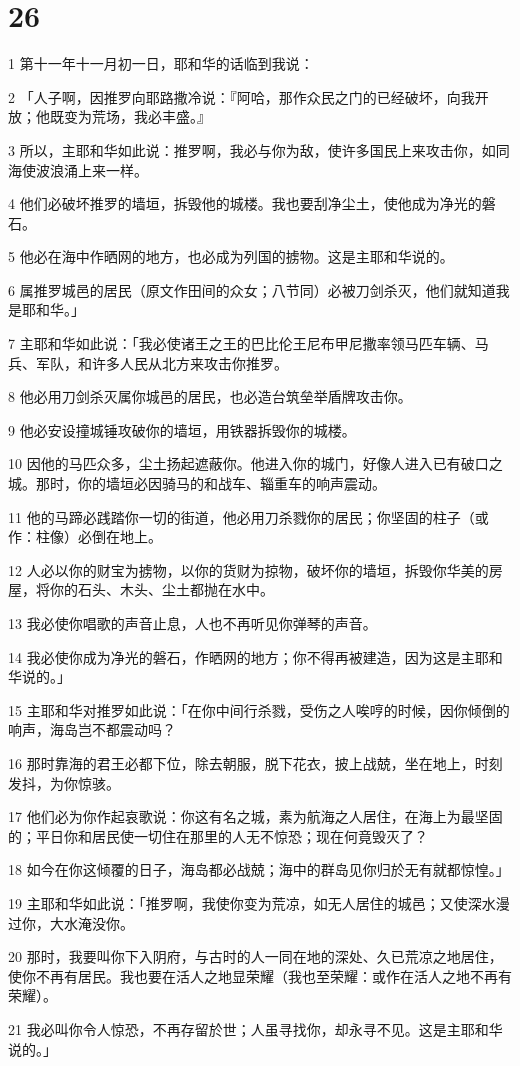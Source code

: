 \chapter{26}

\par 1 第十一年十一月初一日，耶和华的话临到我说：
\par 2 「人子啊，因推罗向耶路撒冷说：『阿哈，那作众民之门的已经破坏，向我开放；他既变为荒场，我必丰盛。』
\par 3 所以，主耶和华如此说：推罗啊，我必与你为敌，使许多国民上来攻击你，如同海使波浪涌上来一样。
\par 4 他们必破坏推罗的墙垣，拆毁他的城楼。我也要刮净尘土，使他成为净光的磐石。
\par 5 他必在海中作晒网的地方，也必成为列国的掳物。这是主耶和华说的。
\par 6 属推罗城邑的居民（原文作田间的众女；八节同）必被刀剑杀灭，他们就知道我是耶和华。」
\par 7 主耶和华如此说：「我必使诸王之王的巴比伦王尼布甲尼撒率领马匹车辆、马兵、军队，和许多人民从北方来攻击你推罗。
\par 8 他必用刀剑杀灭属你城邑的居民，也必造台筑垒举盾牌攻击你。
\par 9 他必安设撞城锤攻破你的墙垣，用铁器拆毁你的城楼。
\par 10 因他的马匹众多，尘土扬起遮蔽你。他进入你的城门，好像人进入已有破口之城。那时，你的墙垣必因骑马的和战车、辎重车的响声震动。
\par 11 他的马蹄必践踏你一切的街道，他必用刀杀戮你的居民；你坚固的柱子（或作：柱像）必倒在地上。
\par 12 人必以你的财宝为掳物，以你的货财为掠物，破坏你的墙垣，拆毁你华美的房屋，将你的石头、木头、尘土都抛在水中。
\par 13 我必使你唱歌的声音止息，人也不再听见你弹琴的声音。
\par 14 我必使你成为净光的磐石，作晒网的地方；你不得再被建造，因为这是主耶和华说的。」
\par 15 主耶和华对推罗如此说：「在你中间行杀戮，受伤之人唉哼的时候，因你倾倒的响声，海岛岂不都震动吗？
\par 16 那时靠海的君王必都下位，除去朝服，脱下花衣，披上战兢，坐在地上，时刻发抖，为你惊骇。
\par 17 他们必为你作起哀歌说：你这有名之城，素为航海之人居住，在海上为最坚固的；平日你和居民使一切住在那里的人无不惊恐；现在何竟毁灭了？
\par 18 如今在你这倾覆的日子，海岛都必战兢；海中的群岛见你归於无有就都惊惶。」
\par 19 主耶和华如此说：「推罗啊，我使你变为荒凉，如无人居住的城邑；又使深水漫过你，大水淹没你。
\par 20 那时，我要叫你下入阴府，与古时的人一同在地的深处、久已荒凉之地居住，使你不再有居民。我也要在活人之地显荣耀（我也至荣耀：或作在活人之地不再有荣耀）。
\par 21 我必叫你令人惊恐，不再存留於世；人虽寻找你，却永寻不见。这是主耶和华说的。」

